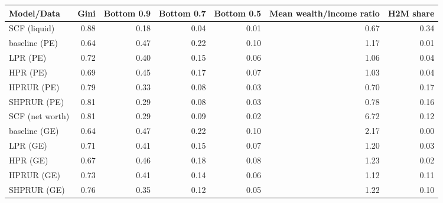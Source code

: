 \begin{tabular}{lrrrrrr}
\toprule
     Model/Data &  Gini &  Bottom 0.9 &  Bottom 0.7 &  Bottom 0.5 &  Mean wealth/income ratio &  H2M share \\
\midrule
   SCF (liquid) &  0.88 &        0.18 &        0.04 &        0.01 &                      0.67 &       0.34 \\
  baseline (PE) &  0.64 &        0.47 &        0.22 &        0.10 &                      1.17 &       0.01 \\
       LPR (PE) &  0.72 &        0.40 &        0.15 &        0.06 &                      1.06 &       0.04 \\
       HPR (PE) &  0.69 &        0.45 &        0.17 &        0.07 &                      1.03 &       0.04 \\
     HPRUR (PE) &  0.79 &        0.33 &        0.08 &        0.03 &                      0.70 &       0.17 \\
    SHPRUR (PE) &  0.81 &        0.29 &        0.08 &        0.03 &                      0.78 &       0.16 \\
SCF (net worth) &  0.81 &        0.29 &        0.09 &        0.02 &                      6.72 &       0.12 \\
  baseline (GE) &  0.64 &        0.47 &        0.22 &        0.10 &                      2.17 &       0.00 \\
       LPR (GE) &  0.71 &        0.41 &        0.15 &        0.07 &                      1.20 &       0.03 \\
       HPR (GE) &  0.67 &        0.46 &        0.18 &        0.08 &                      1.23 &       0.02 \\
     HPRUR (GE) &  0.73 &        0.41 &        0.14 &        0.06 &                      1.12 &       0.11 \\
    SHPRUR (GE) &  0.76 &        0.35 &        0.12 &        0.05 &                      1.22 &       0.10 \\
\bottomrule
\end{tabular}
